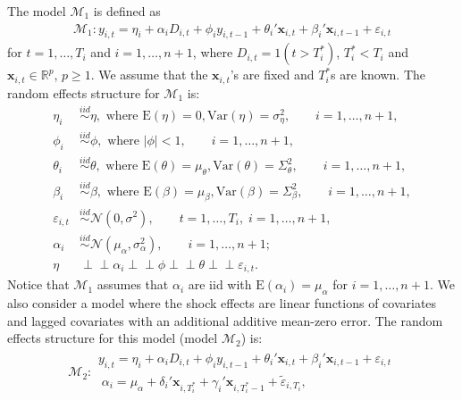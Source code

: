 \documentclass[11pt]{article}
\newcommand{\R}{\mathbb{R}}
\newcommand{\x}{\textbf{x}}
\def\mbf#1{\mathbf{#1}} %
\newcommand{\simiid}{\stackrel{iid}{\sim}} %
\def\where{\text{ where }} %
\newcommand{\indep}{\perp \!\!\! \perp } %
\def\t#1{\tilde{#1}} %
\def\normal#1#2{\mathcal{N}(#1,#2)} %
\def\mc#1{\mathcal{#1}} %
\def\E#1{\mathrm{E}(#1)} %
\def\var#1{\mathrm{Var}(#1)} %
\theoremstyle{definition}
\begin{document}
The model $\mc{M}_1$ is defined as
\begin{align}
\mc{M}_1 \colon y_{i,t} =\eta_i +\alpha_i D_{i,t} + \phi_i y_{i, t-1} + \theta_i'\mbf{x}_{i,t}+ \beta_i'\mbf{x}_{i, t-1} + \varepsilon_{i,t}\label{equation1}
\end{align}
for $t = 1,\ldots,T_i$ and $i = 1,\ldots, n+1$, where $D_{i,t} = 1(t > T_i^*)$, 
$T_i^* < T_i$ and $\x_{i,t} \in \R^{p}$, $p \geq 1$.  We assume that the 
$\mbf{x}_{i,t}$'s are fixed and $T_i^*$s are known. The random effects structure for $\mc{M}_1$ is:
\begin{align*}
  \eta_i &\simiid  \eta ,\where \E{\eta} = 0, \var{\eta} = \sigma^2_{\eta}, \qquad i = 1, \ldots, n+1,\\
  \phi_i &\simiid \phi, \where |\phi|<1, \qquad i = 1, \ldots, n+1, \\
   \theta_i &\simiid \theta, \where \E{\theta}=\mu_{\theta}, \var{\theta}=\Sigma_{\theta}^2, \qquad i = 1, \ldots, n + 1, \\
\beta_i &\simiid \beta, \where \E{\beta}=\mu_{\beta}, \var{\beta}=\Sigma_{\beta}^2, \qquad i = 1, \ldots, n+1,\\
\varepsilon_{i,t} &\simiid \normal{0}{\sigma^2}, \qquad t=1, \ldots, T_i, \; i = 1, \ldots, n+1,\\
\alpha_i &\simiid  \normal{\mu_{\alpha}}{\sigma^2_{\alpha}}, \qquad  i = 1, \ldots, n+1; \\
\eta &\indep  \alpha_i \indep \phi \indep \theta \indep \varepsilon_{i,t}.
\end{align*}
Notice that $\mc{M}_1$ assumes that $\alpha_i$ are iid with $\E{\alpha_i}=\mu_{\alpha}$ 
for $i = 1, \ldots, n+1$.  %
We also consider a model where the shock effects are linear functions of covariates and 
lagged covariates with an additional additive mean-zero error.
The random effects structure for this model (model $\mc{M}_2$) is:
\begin{align}
\mc{M}_2 \colon \begin{array}{l}
  y_{i,t} =\eta_i +\alpha_i D_{i,t} + \phi_i y_{i, t-1} + \theta_i'\mbf{x}_{i,t}+ \beta_i'\mbf{x}_{i, t-1} + \varepsilon_{i,t}\\[.2cm]
  \; \alpha_i = \mu_{\alpha}+\delta_{i}'\mbf{x}_{i, T_i^*}+\gamma_i'\mbf{x}_{i, T^*_i-1}+\t{\varepsilon}_{i, T_i},
\end{array}\label{model2}
\end{align}
\end{document}

